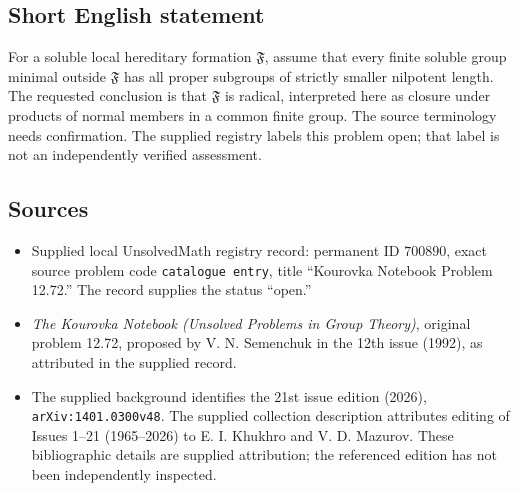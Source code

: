 \documentclass[11pt]{article}
\begin{document}
\subsection{Short English statement}
For a soluble local hereditary formation \(\mathfrak F\), assume that every finite soluble group minimal outside \(\mathfrak F\) has all proper subgroups of strictly smaller nilpotent length. The requested conclusion is that \(\mathfrak F\) is radical, interpreted here as closure under products of normal members in a common finite group. The source terminology needs confirmation. The supplied registry labels this problem open; that label is not an independently verified assessment.
\subsection{Sources}
\begin{itemize}
\item Supplied local UnsolvedMath registry record: permanent ID \(700890\), exact source problem code \texttt{catalogue entry}, title ``Kourovka Notebook Problem 12.72.'' The record supplies the status ``open.''
\item \emph{The Kourovka Notebook (Unsolved Problems in Group Theory)}, original problem 12.72, proposed by V. N. Semenchuk in the 12th issue (1992), as attributed in the supplied record.
\item The supplied background identifies the 21st issue edition (2026), \texttt{arXiv:1401.0300v48}. The supplied collection description attributes editing of Issues 1--21 (1965--2026) to E. I. Khukhro and V. D. Mazurov. These bibliographic details are supplied attribution; the referenced edition has not been independently inspected.
\end{itemize}
\end{document}

